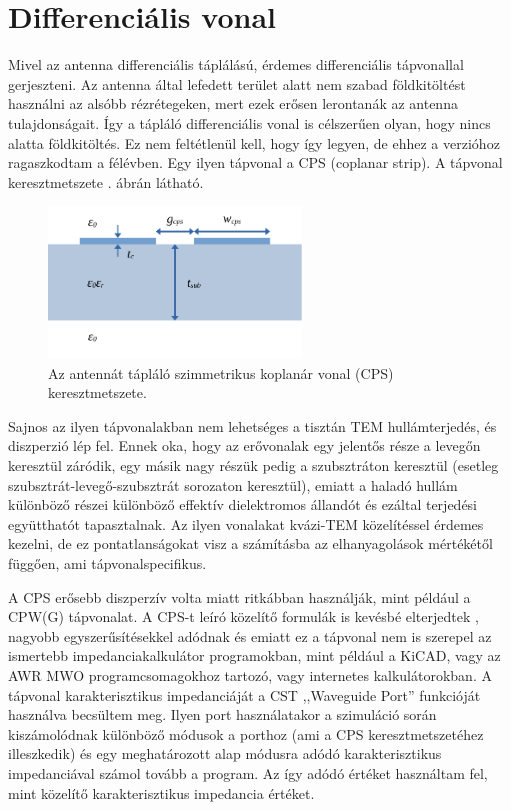 \section{Differenciális vonal}
Mivel az antenna differenciális táplálású, érdemes differenciális tápvonallal gerjeszteni. Az antenna által lefedett terület alatt nem szabad földkitöltést használni az alsóbb rézrétegeken, mert ezek erősen lerontanák az antenna tulajdonságait. Így a tápláló differenciális vonal is célszerűen olyan, hogy nincs alatta földkitöltés. Ez nem feltétlenül kell, hogy így legyen, de ehhez a verzióhoz ragaszkodtam a félévben. Egy ilyen tápvonal a CPS (coplanar strip). A tápvonal keresztmetszete . ábrán látható.
\begin{figure}[h]
	\centering
	\includegraphics[width=0.6\textwidth]{kep/cps.pdf}
	\caption{Az antennát tápláló szimmetrikus koplanár vonal (CPS) keresztmetszete.}
	\label{fig:cps}
\end{figure}
\par Sajnos az ilyen tápvonalakban nem lehetséges a tisztán TEM hullámterjedés, és diszperzió lép fel. Ennek oka, hogy az erővonalak egy jelentős része a levegőn keresztül záródik, egy másik nagy részük pedig a szubsztráton keresztül (esetleg szubsztrát-levegő-szubsztrát sorozaton keresztül), emiatt a haladó hullám különböző részei különböző effektív dielektromos állandót és ezáltal terjedési együtthatót tapasztalnak. Az ilyen vonalakat kvázi-TEM közelítéssel érdemes kezelni, de ez pontatlanságokat visz a számításba az elhanyagolások mértékétől függően, ami tápvonalspecifikus.
\par A CPS erősebb diszperzív volta miatt ritkábban használják, mint például a CPW(G) tápvonalat. A CPS-t leíró közelítő formulák is kevésbé elterjedtek \cite{coupled-slots, analytical}, nagyobb egyszerűsítésekkel adódnak és emiatt ez a tápvonal nem is szerepel az ismertebb impedanciakalkulátor programokban, mint például a KiCAD, vagy az AWR MWO programcsomagokhoz tartozó, vagy internetes kalkulátorokban. A tápvonal karakterisztikus impedanciáját a CST ,,Waveguide Port'' funkcióját használva becsültem meg. Ilyen port használatakor a szimuláció során kiszámolódnak különböző módusok a porthoz (ami a CPS keresztmetszetéhez illeszkedik) és egy meghatározott alap módusra adódó karakterisztikus impedanciával számol tovább a program. Az így adódó értéket használtam fel, mint közelítő karakterisztikus impedancia értéket.
